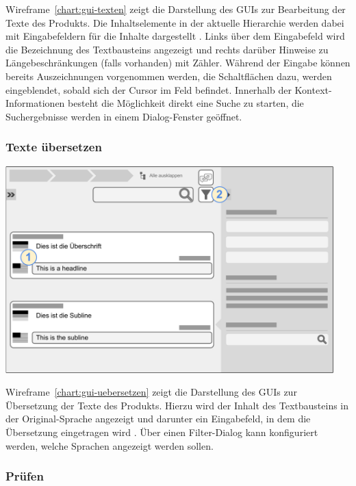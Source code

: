 Wireframe~\ref{chart:gui-texten} zeigt die Darstellung des GUIs zur Bearbeitung der Texte des Produkts. Die Inhaltselemente in der aktuelle Hierarchie werden dabei mit Eingabefeldern für die Inhalte dargestellt . Links über dem Eingabefeld wird die Bezeichnung des Textbausteins angezeigt und rechts darüber Hinweise zu Längebeschränkungen (falls vorhanden) mit Zähler. Während der Eingabe können bereits Auszeichnungen vorgenommen werden, die Schaltflächen dazu, werden eingeblendet, sobald sich der Cursor im Feld befindet. Innerhalb der Kontext-Informationen  besteht die Möglichkeit direkt eine Suche zu starten, die Suchergebnisse werden in einem Dialog-Fenster geöffnet. 

\pagebreak

\subsubsection{Texte übersetzen}\label{l:gui-uebersetzen}

\begin{center}
\includegraphics[width=0.95\textwidth]{media/GUITexteuebersetzen.pdf}
\label{chart:gui-uebersetzen}
\end{center}

Wireframe~\ref{chart:gui-uebersetzen} zeigt die Darstellung des GUIs zur Übersetzung der Texte des Produkts. Hierzu wird der Inhalt des Textbausteins in der Original-Sprache angezeigt und darunter ein Eingabefeld, in dem die Übersetzung eingetragen wird . Über einen Filter-Dialog  kann konfiguriert werden, welche Sprachen angezeigt werden sollen.

\pagebreak

\subsubsection{Prüfen}\label{l:gui-qs}


